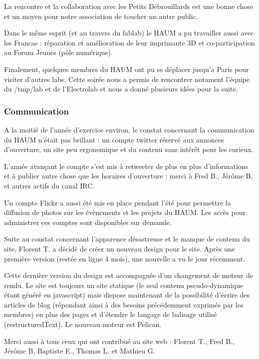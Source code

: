 \documentclass[a4paper, 11pt]{article}
\begin{document}
La rencontre et la collaboration avec les Petits Débrouillards est une bonne chose et un moyen pour notre association de toucher un autre public.

Dans le même esprit (et au travers du fablab) le HAUM a pu travailler aussi avec les Francas : réparation et amélioration de leur imprimante 3D et co-participation au Forum Jeunes (pôle numérique).

Finalement, quelques membres du HAUM ont pu se déplacer jusqu'a Paris pour visiter d'autres labs. Cette soirée nous a permis de rencontrer notament l'équipe du /tmp/lab et de l'Electrolab et nous a donné plusieurs idées pour la suite.
    
\subsubsection{Communication}

A la moitié de l'année d'exercice environ, le constat concernant la communication du HAUM n'était pas brillant : un compte twitter réservé aux annonces d'ouverture, un site peu ergonomique et du contenu sans intérêt pour les curieux.

L'année avançant le compte s'est mis à retweeter de plus en plus d'informations et à publier autre chose que les horaires d'ouverture : merci à Fred B., Jérôme B. et autres actifs du canal IRC.

Un compte Flickr a aussi été mis en place pendant l'été pour permettre la diffusion de photos sur les évènements et les projets du HAUM. Les accès pour administrer ces comptes sont disponibles sur demande.

Suite au constat concernant l'apparence désastreuse et le manque de contenu du site, Florent T. a décidé de créer un nouveau design pour le site. Après une première version (restée en ligne 4 mois), une nouvelle a vu le jour récemment.

Cette dernière version du design est accompagnée d'un changement de moteur de rendu. Le site est toujours un site statique (le seul contenu pseudo-dynamique étant généré en javascript) mais dispose maintenant de la possibilité d'écrire des articles de blog (répondant ainsi à des besoins précédemment exprimés par les membres) en plus des pages et d'étendre le langage de balisage utilisé (restructuredText). Le nouveau moteur est Pelican.

Merci aussi à tous ceux qui ont contribué au site web : Florent T., Fred B., Jérôme B, Baptiste E., Thomas L. et Mathieu G.
\end{document}
